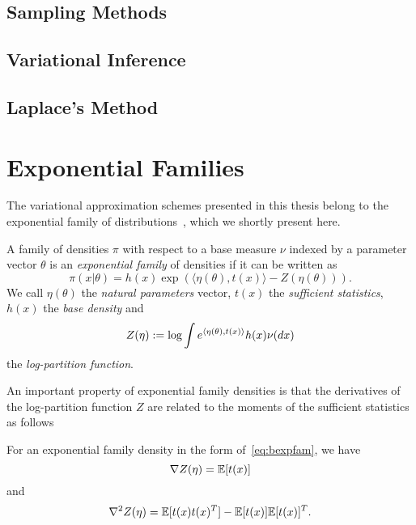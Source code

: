 \subsection{Sampling Methods}
\label{subsec:b-sampling-methods}

\subsection{Variational Inference}
\label{subsec:b-variational-inference}

\subsection{Laplace's Method}
\label{subsec:b-laplace-method}

\section{Exponential Families}
\label{sec:b-expfam}

The variational approximation schemes presented in this thesis belong to the exponential family of distributions~\citep{wainwright08}, which we shortly present here.

\begin{ndefn} \label{def:bexpfam}
A family of densities $\pi$ with respect to a base measure $\nu$ indexed by a parameter vector $\theta$ is an \emph{exponential family} of densities if it can be written as
\[
\pi(x|\theta) = h(x) \exp\left( \langle \eta(\theta), t(x) \rangle - Z(\eta(\theta)) \right).
\label{eq:bexpfam}
\]
We call $\eta(\theta)$ the \emph{natural parameters} vector, $t(x)$ the \emph{sufficient statistics}, $h(x)$ the \emph{base density} and 
\[
Z(\eta):= \log \int e^{\langle \eta(\theta), t(x) \rangle } h(x) \nu(dx)
\label{eq:b-logpartition}
\]
the \emph{log-partition function}.
\end{ndefn}

An important property of exponential family densities is that the derivatives of the log-partition function $Z$ are related to the moments of the sufficient statistics as follows

\begin{nprop} \label{prop:bgradZ}
For an exponential family density in the form of~\cref{eq:bexpfam}, we have 
\[
\nabla Z(\eta) = \mathbb{E}[t(x)]
\label{eq:bgradZ}
\] 	
and 
\[
\nabla^2Z(\eta) = \mathbb{E}[t(x)t(x)^T] - \mathbb{E}[t(x)]\mathbb{E}[t(x)]^T.
\label{eq:bhessZ}
\]
\end{nprop}

